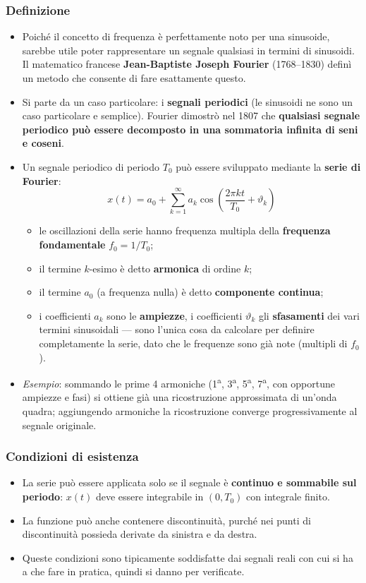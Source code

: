 \documentclass[12pt, a4paper]{article}
\begin{document}
\subsubsection{Definizione}
\begin{itemize}
    \item Poiché il concetto di frequenza è perfettamente noto per una sinusoide, sarebbe utile poter rappresentare un segnale qualsiasi in termini di sinusoidi. Il matematico francese \textbf{Jean-Baptiste Joseph Fourier} (1768--1830) definì un metodo che consente di fare esattamente questo.
    \item Si parte da un caso particolare: i \textbf{segnali periodici} (le sinusoidi ne sono un caso particolare e semplice). Fourier dimostrò nel 1807 che \textbf{qualsiasi segnale periodico può essere decomposto in una sommatoria infinita di seni e coseni}.
    \item Un segnale periodico di periodo $T_0$ può essere sviluppato mediante la \textbf{serie di Fourier}:
    $$x(t) = a_0 + \sum_{k=1}^{\infty} a_k\cos\!\left(\frac{2\pi kt}{T_0}+\vartheta_k\right)$$
    \begin{itemize}
        \item le oscillazioni della serie hanno frequenza multipla della \textbf{frequenza fondamentale} $f_0=1/T_0$;
        \item il termine $k$-esimo è detto \textbf{armonica} di ordine $k$;
        \item il termine $a_0$ (a frequenza nulla) è detto \textbf{componente continua};
        \item i coefficienti $a_k$ sono le \textbf{ampiezze}, i coefficienti $\vartheta_k$ gli \textbf{sfasamenti} dei vari termini sinusoidali — sono l'unica cosa da calcolare per definire completamente la serie, dato che le frequenze sono già note (multipli di $f_0$).
    \end{itemize}
    \item \textit{Esempio}: sommando le prime 4 armoniche (1\textsuperscript{a}, 3\textsuperscript{a}, 5\textsuperscript{a}, 7\textsuperscript{a}, con opportune ampiezze e fasi) si ottiene già una ricostruzione approssimata di un'onda quadra; aggiungendo armoniche la ricostruzione converge progressivamente al segnale originale.
\end{itemize}

\subsubsection{Condizioni di esistenza}
\begin{itemize}
    \item La serie può essere applicata solo se il segnale è \textbf{continuo e sommabile sul periodo}: $x(t)$ deve essere integrabile in $(0,T_0)$ con integrale finito.
    \item La funzione può anche contenere discontinuità, purché nei punti di discontinuità possieda derivate da sinistra e da destra.
    \item Queste condizioni sono tipicamente soddisfatte dai segnali reali con cui si ha a che fare in pratica, quindi si danno per verificate.
\end{itemize}
\end{document}
